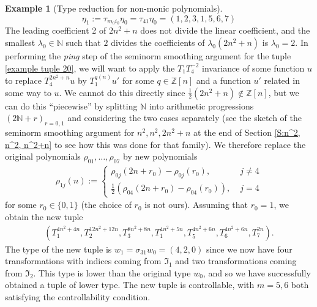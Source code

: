 \documentclass[11pt]{amsart}
\theoremstyle{definition}
\newtheorem{example}{Example}
\newcommand{\N}{{\mathbb N}}
\newcommand{\Z}{{\mathbb Z}}
\newcommand{\FI}{{\mathfrak I}}
\begin{document}
\begin{example}[Type reduction for non-monic polynomials]
$$\eta_1 := \tau_{m_0 i_0} \eta_0 = \tau_{41}\eta_0 = (1, 2, 3, 1, 5, 6, 7)$$
The leading coefficient 2 of $2n^2+n$ does not divide the linear coefficient, and the smallest $\lambda_0\in\N$ such that $2$ divides the coefficients of $\lambda_0(2n^2+n)$ is $\lambda_0 = 2$. In performing the \textit{ping} step of the seminorm smoothing argument for the tuple \eqref{example tuple 20}, we will want to apply the $T_1 T_4^{-2}$ invariance of some function $u$ to replace $T_4^{2n^2+n}u$ by $T_1^{q(n)}u'$ for some $q\in\Z[n]$ and a function $u'$ related in some way to $u$. We cannot do this directly since $\frac{1}{2}(2n^2+n)\notin\Z[n]$, but we can do this ``piecewise'' by splitting $\N$ into arithmetic progressions $(2\N + r)_{r=0, 1}$ and considering the two cases separately (see the sketch of the seminorm smoothing argument for $n^2, n^2, 2n^2+n$ at the end of Section \ref{S:n^2, n^2, n^2+n} to see how this was done for that family). We therefore replace the original polynomials $\rho_{01}, \ldots, \rho_{07}$ by new polynomials
\begin{align*}
    \rho_{1j}(n) := \begin{cases} \rho_{0j}(2 n + r_0) - \rho_{0j}(r_0),\; &j \neq 4\\
    \frac{1}{2}(\rho_{04}(2 n + r_0) - \rho_{04}(r_0)),\; &j =4
    \end{cases}
\end{align*}
for some $r_0\in\{0,1\}$ (the choice of $r_0$ is not ours).
Assuming that $r_0=1$, we obtain the new tuple
\begin{align}\label{example tuple 21}
    (T_1^{4n^2 + 4n}, T_2^{12n^2+12n}, T_3^{8n^2+8n}, T_1^{4n^2+5n}, T_5^{4n^2+6n}, T_6^{4n^2+6n}, T_7^{2n}).
\end{align}
The type of the new tuple is $w_1 = \sigma_{31}w_0 = (4, 2,0)$ since we now have four transformations with indices coming from $\FI_1$ and two transformations coming from $\FI_2$. This type is lower than the original type $w_0$, and so we have successfully obtained a tuple of lower type. The new tuple is controllable, with $m=5,6$ both satisfying the controllability condition.


\end{example}
\end{document}
